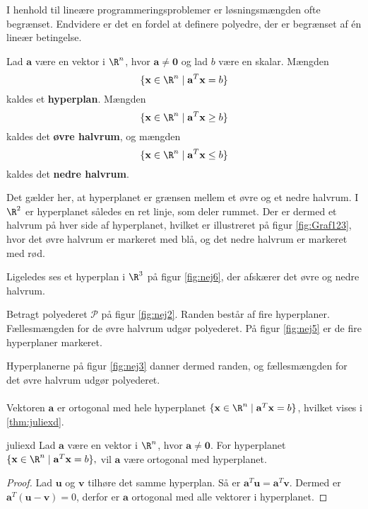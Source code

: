 \noindent
% 
%
%
I henhold til lineære programmeringsproblemer er løsningsmængden ofte begrænset.
Endvidere er det en fordel at definere polyedre, der er begrænset af én lineær betingelse. 
%
\begin{defn}{}{}
Lad $\mathbf{a}$ være en vektor i $\R^n$, hvor $\mathbf{a} \neq \mathbf{0}$ og lad $b$ være en skalar.
Mængden $$\{\textbf{x} \in \R^n \mid \mathbf{a}^T \mathbf{x}=b\}$$ kaldes et \textbf{hyperplan}.
%
Mængden $$\{\textbf{x} \in \R^n \mid \mathbf{a}^T \mathbf{x} \geq b\}$$ kaldes det \textbf{øvre halvrum}, og
mængden $$\{\textbf{x} \in \R^n \mid \mathbf{a}^T \mathbf{x} \leq b\}$$ kaldes det \textbf{nedre halvrum}.
\end{defn}
\noindent
%
Det gælder her, at hyperplanet er grænsen mellem et øvre og et nedre halvrum.
I $\R^2$ er hyperplanet således en ret linje, som deler rummet. 
Der er dermed et halvrum på hver side af hyperplanet, hvilket er illustreret på figur \ref{fig:Graf123}, hvor det øvre halvrum er markeret med blå, og det nedre halvrum er markeret med rød. 
%
%

%
Ligeledes ses et hyperplan i $\R^3$ på figur \ref{fig:nej6}, der afskærer det øvre og nedre halvrum.
%
%

%
Betragt polyederet $\mathcal{P}$ på figur \ref{fig:nej2}. 
Randen består af fire hyperplaner.
Fællesmængden for de øvre halvrum udgør polyederet.
På figur \ref{fig:nej5} er de fire hyperplaner markeret. 
%
%

%
Hyperplanerne på figur \ref{fig:nej3} danner dermed randen, og fællesmængden for det øvre halvrum udgør polyederet.
\\\\
%
%
%
Vektoren $\textbf{a}$ er ortogonal med hele hyperplanet $\{\textbf{x} \in \R^n \mid \mathbf{a}^T \mathbf{x}=b\}$, hvilket vises i \ref{thm:juliexd}. 
%
\begin{thm}{}{juliexd}
Lad $\mathbf{a}$ være en vektor i $\R^n$, hvor 
$\mathbf{a} \neq \mathbf{0}.$
For hyperplanet 
$\{\textbf{x} \in \R^n \mid \mathbf{a}^T \mathbf{x}=b\},$ 
vil $\mathbf{a}$ være ortogonal med hyperplanet.
\end{thm}
%
\begin{proof}
Lad $\mathbf{u}$ og $\mathbf{v}$ tilhøre det samme hyperplan. 
Så er $\mathbf{a}^T\textbf{u}=\mathbf{a}^T\textbf{v}.$
Dermed er $\mathbf{a}^T(\textbf{u}-\textbf{v})=0$, derfor er $\mathbf{a}$ ortogonal med alle vektorer i hyperplanet. 
\end{proof}